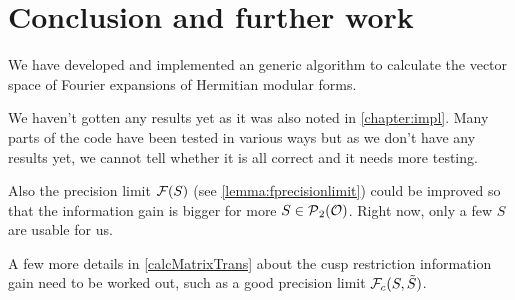 
\section{Conclusion and further work}

We have developed and implemented an generic algorithm to calculate the vector space of Fourier expansions of Hermitian modular forms.

We haven't gotten any results yet as it was also noted in \cref{chapter:impl}. Many parts of the code have been tested in various ways but as we don't have any results yet, we cannot tell whether it is all correct and it needs more testing.

Also the precision limit $\mathcal{F}(S)$ (see \cref{lemma:fprecisionlimit}) could be improved so that the information gain is bigger for more $S \in \operatorname{\mathcal{P}}_2(\mathcal{O})$. Right now, only a few $S$ are usable for us.

A few more details in \cref{calcMatrixTrans} about the cusp restriction information gain need to be worked out, such as a good precision limit $\mathcal{F}_c(S,\tilde{S})$.
